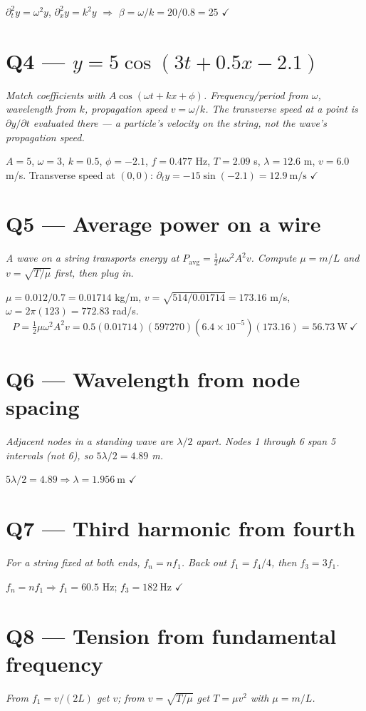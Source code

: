 \documentclass[11pt]{article}
\newcommand{\checkmk}{\ensuremath{\checkmark}}
\begin{document}
$\partial_t^2 y = \omega^2 y$, $\partial_x^2 y = k^2 y$ $\Rightarrow$ $\beta = \omega/k = 20/0.8 = \boxed{25}$ \checkmk

\section*{Q4 --- $y = 5\cos(3t + 0.5x - 2.1)$}
\emph{Match coefficients with $A\cos(\omega t + kx + \phi)$. Frequency/period from $\omega$, wavelength from $k$, propagation speed $v = \omega/k$. The transverse speed at a point is $\partial y/\partial t$ evaluated there --- a particle's velocity on the string, not the wave's propagation speed.}

$A = 5$, $\omega = 3$, $k = 0.5$, $\phi = -2.1$, $f = 0.477$ Hz, $T = 2.09$ s, $\lambda = 12.6$ m, $v = 6.0$ m/s.
Transverse speed at $(0,0)$: $\partial_t y = -15\sin(-2.1) = \boxed{12.9\ \text{m/s}}$ \checkmk

\section*{Q5 --- Average power on a wire}
\emph{A wave on a string transports energy at $P_{\text{avg}} = \tfrac12 \mu \omega^2 A^2 v$. Compute $\mu = m/L$ and $v = \sqrt{T/\mu}$ first, then plug in.}

$\mu = 0.012/0.7 = 0.01714$ kg/m, $v = \sqrt{514/0.01714} = 173.16$ m/s, $\omega = 2\pi(123) = 772.83$ rad/s.
\[ P = \tfrac12\mu\omega^2 A^2 v = 0.5(0.01714)(597270)(6.4\times10^{-5})(173.16) = \boxed{56.73\ \text{W}}\ \checkmk \]

\section*{Q6 --- Wavelength from node spacing}
\emph{Adjacent nodes in a standing wave are $\lambda/2$ apart. Nodes 1 through 6 span 5 intervals (not 6), so $5\lambda/2 = 4.89$ m.}

$5\lambda/2 = 4.89 \Rightarrow \lambda = \boxed{1.956\ \text{m}}$ \checkmk

\section*{Q7 --- Third harmonic from fourth}
\emph{For a string fixed at both ends, $f_n = n f_1$. Back out $f_1 = f_4/4$, then $f_3 = 3 f_1$.}

$f_n = nf_1 \Rightarrow f_1 = 60.5$ Hz; $f_3 = \boxed{182\ \text{Hz}}$ \checkmk

\section*{Q8 --- Tension from fundamental frequency}
\emph{From $f_1 = v/(2L)$ get $v$; from $v = \sqrt{T/\mu}$ get $T = \mu v^2$ with $\mu = m/L$.}
\end{document}
